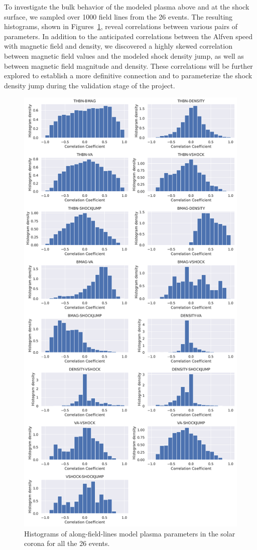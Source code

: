 To investigate the bulk behavior of the modeled plasma above and at the shock surface, we sampled over 1000 field lines from the 26 events. The resulting histograms, shown in Figures~\ref{fig_hist_plasma_param_corr}, reveal correlations between various pairs of parameters. In addition to the anticipated correlations between the Alfven speed with magnetic field and density, we discovered a highly skewed correlation between magnetic field values and the modeled shock density jump, as well as between magnetic field magnitude and density. These correlations will be further explored to establish a more definitive connection and to parameterize the shock density jump during the validation stage of the project.

\begin{figure}[!htp] %
	\centerline{\includegraphics[width=0.7\columnwidth]{chapter2/figs/wp3_d2_Fig16.pdf}}
	\caption{Histograms of along-field-lines model plasma parameters in the solar corona for all the 26 events.}
	\label{fig_hist_plasma_param_corr}
\end{figure}


